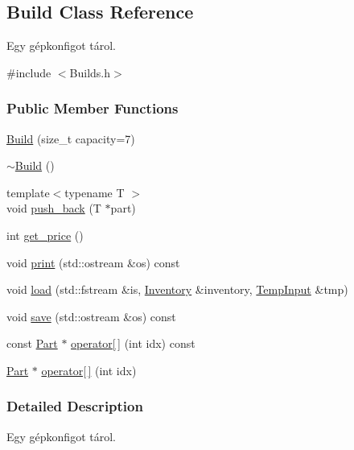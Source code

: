 \subsection{Build Class Reference}
\label{class_build}


Egy gépkonfigot tárol.  




{\ttfamily \#include $<$Builds.\+h$>$}

\subsubsection*{Public Member Functions}
\begin{DoxyCompactItemize}
\item 
\mbox{\hyperlink{class_build_ab9b72c3479d483c0b452af30bb544de8}{Build}} (size\+\_\+t capacity=7)
\item 
\mbox{\hyperlink{class_build_a8f1d400e9bc158b6339cc1785b18d07b}{$\sim$\+Build}} ()
\item 
{\footnotesize template$<$typename T $>$ }\\void \mbox{\hyperlink{class_build_aba0548391a8c613ed2a9d81d4d3b2a4b}{push\+\_\+back}} (T $\ast$part)
\item 
int \mbox{\hyperlink{class_build_aded745a17c7d6b569244cb377ff62a9c}{get\+\_\+price}} ()
\item 
void \mbox{\hyperlink{class_build_adb328444dd8bf97b36356be36db01194}{print}} (std\+::ostream \&os) const
\item 
void \mbox{\hyperlink{class_build_a754a988f73da756210b083814986f2f1}{load}} (std\+::fstream \&is, \mbox{\hyperlink{class_inventory}{Inventory}} \&inventory, \mbox{\hyperlink{struct_temp_input}{Temp\+Input}} \&tmp)
\item 
void \mbox{\hyperlink{class_build_a954cd881cec1bf789fb57d7cdf617367}{save}} (std\+::ostream \&os) const
\item 
const \mbox{\hyperlink{class_part}{Part}} $\ast$ \mbox{\hyperlink{class_build_af3e03ed173016d7ff348d1e7057bd97c}{operator\mbox{[}$\,$\mbox{]}}} (int idx) const
\item 
\mbox{\hyperlink{class_part}{Part}} $\ast$ \mbox{\hyperlink{class_build_aa48e871d88c60272ab5f6cd5b97aaad0}{operator\mbox{[}$\,$\mbox{]}}} (int idx)
\end{DoxyCompactItemize}


\subsubsection{Detailed Description}
Egy gépkonfigot tárol. 

